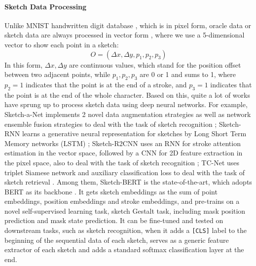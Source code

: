 \documentclass{article}
\begin{document}
\paragraph{Sketch Data Processing}
Unlike MNIST handwritten digit database \citep{MNIST}, which is in pixel form, oracle data or sketch data are always processed  in vector form \citep{Sketch-BERT}, where we use a 5-dimensional vector to show each point in a sketch:
\begin{equation}
	O = (\Delta x, \Delta y, p_1, p_2, p_3)
	\label{equ:vec}
\end{equation}
In this form, $ \Delta x, \Delta y $ are continuous values, which stand for the position offset between two adjacent points,
while $ p_1, p_2, p_3 $ are 0 or 1 and sums to 1, 
where $ p_2 = 1 $ indicates that the point is at the end of a stroke, and $ p_3 = 1 $ indicates that the point is at the end of the whole character.
Based on this, quite a lot of works have sprung up to process sketch data using deep neural networks. For example, Sketch-a-Net implements 2 novel data augmentation strategies as well as network ensemble fusion strategies to deal with the task of sketch recognition \citep{Sketch-a-Net}; Sketch-RNN learns a generative neural representation for sketches by Long Short Term Memory networks (LSTM) \citep{Sketch-RNN}; Sketch-R2CNN uses an RNN for stroke attention estimation in the vector space, followed by a CNN for 2D feature extraction in the pixel space, also to deal with the task of sketch recognition \citep{Sketch-R2CNN}; TC-Net uses triplet Siamese network and auxiliary classification loss to deal with the task of sketch retrieval \citep{TC-Net}. 
Among them, Sketch-BERT is the state-of-the-art, which adopts BERT as its backbone \citep{Sketch-BERT}.
It gets sketch embeddings as the sum of point embeddings, position embeddings and stroke embeddings, and pre-trains on a novel self-supervised learning task, sketch Gestalt task, including mask position prediction and mask state prediction.
It can be fine-tuned and tested on downstream tasks, such as sketch recognition, when it adds a \verb|[CLS]| label to the beginning of the sequential data of each sketch, serves as a generic feature extractor of each sketch and adds a standard softmax classification layer at the end.
\end{document}
